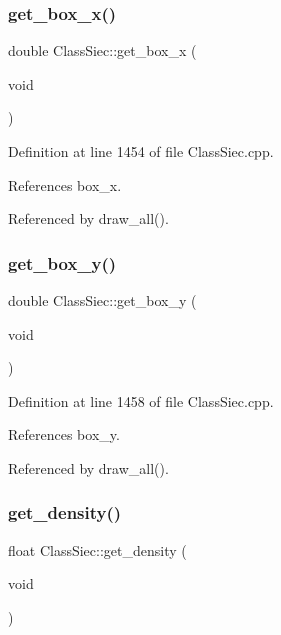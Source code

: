\subsubsection{\texorpdfstring{get\+\_\+box\+\_\+x()}{get\_box\_x()}}
{\footnotesize\ttfamily double Class\+Siec\+::get\+\_\+box\+\_\+x (\begin{DoxyParamCaption}\item[{void}]{ }\end{DoxyParamCaption})}



Definition at line 1454 of file Class\+Siec.\+cpp.



References box\+\_\+x.



Referenced by draw\+\_\+all().

\mbox{\label{classClassSiec_a6670e040d5bd507051671b8bd856c7d0}} 
\subsubsection{\texorpdfstring{get\+\_\+box\+\_\+y()}{get\_box\_y()}}
{\footnotesize\ttfamily double Class\+Siec\+::get\+\_\+box\+\_\+y (\begin{DoxyParamCaption}\item[{void}]{ }\end{DoxyParamCaption})}



Definition at line 1458 of file Class\+Siec.\+cpp.



References box\+\_\+y.



Referenced by draw\+\_\+all().

\mbox{\label{classClassSiec_a1ea898d8e6cb52ffc47e7490e48894e4}} 
\subsubsection{\texorpdfstring{get\+\_\+density()}{get\_density()}}
{\footnotesize\ttfamily float Class\+Siec\+::get\+\_\+density (\begin{DoxyParamCaption}\item[{void}]{ }\end{DoxyParamCaption})}

